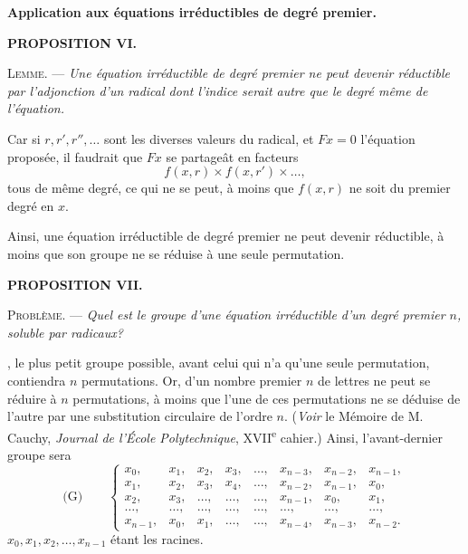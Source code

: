 
\begin{center}
{\large\bfseries Application aux équations irréductibles de degré premier.}
\end{center}

\begin{center}{\bfseries PROPOSITION VI.}\end{center}

\noindent\textsc{Lemme.} --- {\itshape Une équation irréductible de degré premier ne
peut devenir réductible par l'adjonction d'un radical dont
l'indice serait autre que le degré même de l'équation.}

Car si $r,r',r'',\ldots$ sont les diverses valeurs du radical, et
$Fx=0$ l'équation proposée, il faudrait que $Fx$ se partageât en
facteurs
\[
f(x,r)\times f(x,r')\times\ldots,
\]
tous de même degré, ce qui ne se peut, à moins que $f(x,r)$ ne
soit du premier degré en $x$.

Ainsi, une équation irréductible de degré premier ne peut
devenir réductible, à moins que son groupe ne se réduise à une
seule permutation.

\begin{center}{\bfseries PROPOSITION VII.}\end{center}

\noindent\textsc{Problème.} --- {\itshape Quel est le groupe d'une équation irréductible
d'un degré premier $n$, soluble par radicaux?}

, le plus petit groupe possible,
avant celui qui n'a qu'une seule permutation, contiendra $n$ permutations.
Or,  d'un nombre premier $n$
de lettres ne peut se réduire à $n$ permutations, à moins que
l'une de ces permutations ne se déduise de l'autre par une substitution
circulaire de l'ordre $n$. (\emph{Voir} le Mémoire de M. Cauchy,
\emph{Journal de l'École Polytechnique}, XVII\textsuperscript{e} cahier.) Ainsi, l'avant-dernier
groupe sera
\[
\text{(G)}\qquad
\left\{
\begin{array}{cccccccc}
x_{0},    &x_{1}, &x_{2}, &x_{3}, &\ldots, &x_{n-3}, &x_{n-2}, &x_{n-1}, \\
x_{1},    &x_{2}, &x_{3}, &x_{4}, &\ldots, &x_{n-2}, &x_{n-1}, &x_{0}, \\
x_{2},    &x_{3}, &\ldots, &\ldots, &\ldots, &x_{n-1}, &x_{0}, &x_{1}, \\
\ldots,  &\ldots, &\ldots, &\ldots, &\ldots, &\ldots, &\ldots, &\ldots, \\
x_{n-1}, &x_{0}, &x_{1}, &\ldots, &\ldots, &x_{n-4}, &x_{n-3}, &x_{n-2}.
\end{array}
\right.
\]
$x_{0},x_{1},x_{2},\ldots,x_{n-1}$ étant les racines.
